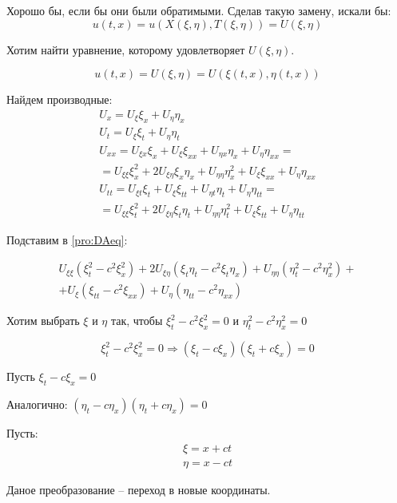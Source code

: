 \documentclass[12pt]{report}
\begin{document}
Хорошо бы, если бы они были обратимыми. Сделав такую замену, искали бы: 
$$u(t,x) = u(X(\xi, \eta), T(\xi, \eta)) = U(\xi, \eta)$$

Хотим найти уравнение, которому удовлетворяет $U(\xi, \eta)$.

$$u(t, x) = U(\xi, \eta) = U(\xi(t, x), \eta(t, x))$$

Найдем производные: 
$$
    \begin{gathered}
        U_x = U_{\xi} \xi_x + U_{\eta} \eta_x
        \\
        U_t = U_{\xi} \xi_t + U_{\eta} \eta_t
        \\
         U_{xx} = U_{\xi x} \xi_x + U_{\xi} \xi_{xx} + U_{\eta x} \eta_x + U_{\eta} \eta_{xx} = 
        \\
        = U_{\xi \xi} \xi_x^2 + 2 U_{\xi \eta} \xi_x \eta_x + U_{\eta \eta} \eta_x^2 + U_\xi \xi_{xx} + U_\eta \eta_{xx} 
        \\
        U_{tt} = U_{\xi t} \xi_t + U_{\xi} \xi_{tt} + U_{\eta t} \eta_t + U_{\eta} \eta_{tt} = 
        \\
        = U_{\xi \xi} \xi_t^2 + 2 U_{\xi \eta} \xi_t \eta_t + U_{\eta \eta} \eta_t^2 + U_\xi \xi_{tt} + U_\eta \eta_{tt} 
    \end{gathered}
$$

Подставим в \eqref{pro:DAeq}: 

$$
    \begin{gathered}
        U_{\xi \xi} (\xi_t^2 - c ^ 2 \xi_x^2) + 2U_{\xi \eta} (\xi_t \eta_t - c ^ 2 \xi_t \eta_x) + U_{\eta \eta} (\eta_t^2 - c ^ 2 \eta_x^2) +
        \\
        + U_\xi (\xi_{tt} - c ^ 2 \xi_{xx}) + U_\eta (\eta_{tt} - c ^ 2 \eta_{xx})
    \end{gathered}
$$

Хотим выбрать $\xi$ и $\eta$ так, чтобы $\xi_t^2 - c ^ 2 \xi_x^2 = 0$ и $\eta_t^2 - c ^ 2 \eta_x^2 = 0$  

$$\xi_t^2 - c ^ 2 \xi_x^2 = 0 \Longrightarrow (\xi_t - c \xi_x)(\xi_t + c \xi_x) = 0$$

Пусть $\xi_t - c \xi_x = 0$

Аналогично: $(\eta_t - c \eta_x)(\eta_t + c \eta_x) = 0$

Пусть: 
$$
    \begin{gathered}
        \xi = x + ct
        \\
        \eta = x - ct
    \end{gathered}
$$

Даное преобразование -- переход в новые координаты. 
\end{document}
